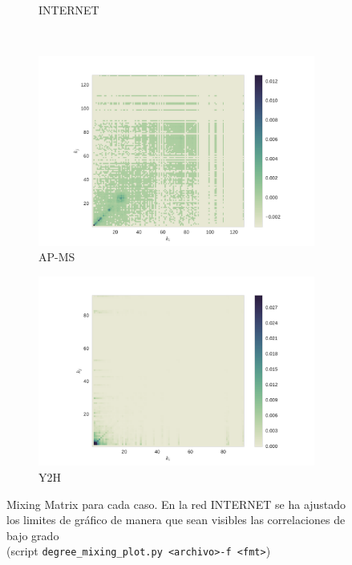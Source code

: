 \begin{figure}[!ht]
\begin{subfigure}[b]{0.45\columnwidth}
        \caption{\label{fig4:INTERNET}INTERNET}
    \end{subfigure}
    \\
    \begin{subfigure}[b]{0.45\columnwidth}
        \includegraphics[width=\textwidth]{./schemes/mixing_yeast_AP-MS-txt.pdf}
        \caption{\label{fig4:ap_ms} AP-MS}
    \end{subfigure}
    \begin{subfigure}[b]{0.45\columnwidth}
        \includegraphics[width=\textwidth]{./schemes/mixing_yeast_Y2H-txt.pdf}
        \caption{\label{fig4:y2h} Y2H}
    \end{subfigure}
    \caption{\label{fig4:mix} Mixing Matrix para cada caso. En la red INTERNET se ha ajustado los limites de gr\'afico
    de manera que sean visibles las correlaciones de bajo grado
    \\(script \texttt{degree\_mixing\_plot.py <archivo>\quad-f <fmt>})}
\end{figure}

